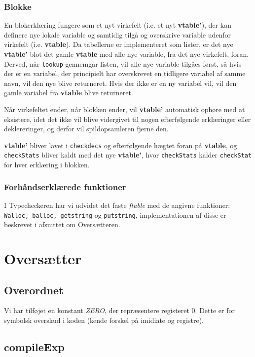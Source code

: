 \documentclass[a4paper, 10pt]{article}
\begin{document}
\subsubsection{Blokke}
En blokerklæring fungere som et nyt virkefelt (i.e. et nyt \textbf{vtable'}), 
der kan definere nye lokale variable og samtidig tilgå og overskrive variable 
udenfor virkefelt (i.e. \textbf{vtable}). Da tabellerne er implementeret som 
lister, er det nye \textbf{vtable'} blot det gamle \textbf{vtable} med alle nye variable, fra det nye virkefelt, foran. 
Derved, når \texttt{lookup} gennemgår listen, vil alle nye variable tilgåes først, så hvis der er en variabel, der principielt har overskrevet en tidligere variabel af samme navn, vil den nye blive returneret. Hvis der ikke er en ny variabel vil, vil den gamle variabel fra \textbf{vtable} blive returneret.

Når virkefeltet ender, når blokken ender, vil \textbf{vtable'} automatisk ophøre med at eksistere, idet det ikke vil blive vidergivet til nogen efterfølgende erklæringer eller deklereringer, og derfor vil spildopsamleren fjerne den.

\textbf{vtable'} bliver lavet i \texttt{checkdecs} og efterfølgende hægtet foran på \textbf{vtable}, og \texttt{checkStats} bliver kaldt med det nye \textbf{vtable'}, hvor \texttt{checkStats} kalder \texttt{checkStat} for hver erklæring i blokken.
     
\subsubsection{Forhåndserklærede funktioner}
I Typecheckeren har vi udvidet det faste \textit{ftable} med de angivne funktioner:
\texttt{Walloc, balloc, getstring} og \texttt{putstring}, implementationen af disse er beskrevet i afsnittet om Oversætteren.


\section{Oversætter}
\subsection{Overordnet}
Vi har tilføjet en konstant \textit{ZERO}, der repræsentere registeret 0. Dette
er for symbolsk overskud i koden (kende forskel på imidiate og registre).

\subsection{compileExp}
\end{document}
